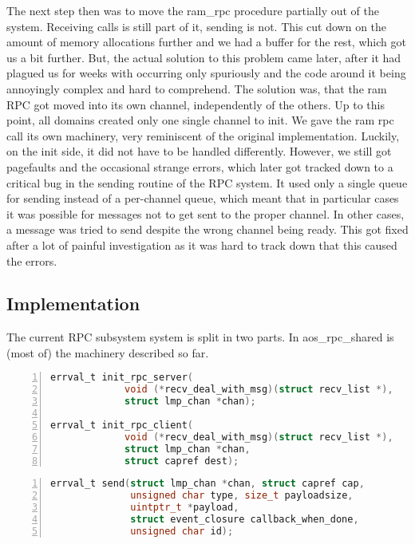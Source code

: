 The next step then was to move the ram\_rpc procedure partially out of the system. 
Receiving calls is still part of it, sending is not. This cut down on the amount of memory allocations 
further and we had a buffer for the rest, which got us a bit 
further. But, the actual solution to this problem came later, after it 
had plagued us for weeks with occurring only spuriously and the code around it 
being annoyingly complex and hard to comprehend.
The solution was, that the ram RPC got moved into its own channel, 
independently of the others. Up to this point, all domains created only one single
channel to init. We gave the ram rpc call its own machinery, very reminiscent of the original 
implementation. Luckily, on the init side, it did not have to be handled 
differently.
However, we still got pagefaults and the occasional strange errors, which 
later got tracked down to a critical bug in the sending routine of the RPC system. It used 
only a single queue for sending instead of a per-channel queue, which meant 
that in particular cases it was possible for messages not to get sent to the 
proper channel. In other cases, a message was tried to send despite the wrong channel being ready. This got fixed after a lot of painful investigation as it 
was hard to track down that this caused the errors.

\subsection{Implementation \label{ss:rpc_implementation}}
The current RPC subsystem system is split in two parts. In 
aos\_rpc\_shared is (most of) the machinery described so far.
\medskip

\begin{lstlisting}[caption={RPC init function prototypes}, 
label=lst:rpc_calls_1, numbers=left, stepnumber=1, float, floatplacement=tl, 
frame=tb, language=c]
errval_t init_rpc_server(
             void (*recv_deal_with_msg)(struct recv_list *),
             struct lmp_chan *chan);

errval_t init_rpc_client(
             void (*recv_deal_with_msg)(struct recv_list *),
             struct lmp_chan *chan, 
             struct capref dest);
\end{lstlisting}
\begin{lstlisting}[caption={RPC send function prototype}, 
label=lst:rpc_calls_2, numbers=left, stepnumber=1, float, floatplacement=tl, 
frame=tb, language=c]
errval_t send(struct lmp_chan *chan, struct capref cap, 
              unsigned char type, size_t payloadsize, 
              uintptr_t *payload, 
              struct event_closure callback_when_done, 
              unsigned char id);
\end{lstlisting}

